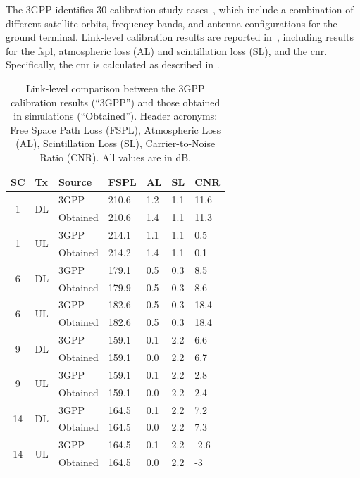The 3GPP identifies 30 calibration study cases~\cite[Tab.~ 6.1.1.1-9]{38821}, which include a combination of different satellite orbits, frequency bands, and antenna configurations for the ground terminal. Link-level calibration results are reported in~\cite[Tab.~6.1.1.2]{38821}, including results for the \gls{fspl}, atmospheric loss (AL) and scintillation loss (SL), and the \gls{cnr}. 
Specifically, the \gls{cnr} is calculated as described in \cite[Section~6.1.3.1]{38821}. 

\begin{table}[t!]
\caption{Link-level comparison between the 3GPP calibration results (``3GPP'') and those obtained in simulations (``Obtained''). Header acronyms:  Free Space Path Loss (FSPL), Atmospheric Loss (AL), Scintillation Loss (SL), Carrier-to-Noise Ratio (CNR). All values are in dB.}
\label{tab:ll-comp}
\vspace{0.1cm}
\centering
\footnotesize
\begin{tabular}{|c|l|l|l|l|l|l|}
\hline
\textbf{SC} & \textbf{Tx} & \textbf{Source} & \textbf{FSPL} & \textbf{AL} & \textbf{SL} & \textbf{CNR} \\ \hline
\multirow{2}{*}{1} & \multirow{2}{*}{DL} & 3GPP & 210.6 & 1.2 & 1.1 & 11.6 \\
 &  & Obtained & 210.6 & 1.4 & 1.1 & 11.3 \\ \hline
\multirow{2}{*}{1} & \multirow{2}{*}{UL} & 3GPP & 214.1 & 1.1 & 1.1 & 0.5 \\
 &  & Obtained & 214.2 & 1.4 & 1.1 & 0.1 \\ \hline
\multirow{2}{*}{6} & \multirow{2}{*}{DL} & 3GPP & 179.1 & 0.5 & 0.3 & 8.5 \\
 &  & Obtained & 179.9 & 0.5 & 0.3 & 8.6 \\ \hline
\multirow{2}{*}{6} & \multirow{2}{*}{UL} & 3GPP & 182.6 & 0.5 & 0.3 & 18.4 \\
 &  & Obtained & 182.6 & 0.5 & 0.3 & 18.4 \\ \hline
\multirow{2}{*}{9} & \multirow{2}{*}{DL} & 3GPP & 159.1 & 0.1 & 2.2 & 6.6 \\
 &  & Obtained & 159.1 & 0.0 & 2.2 & 6.7 \\ \hline
\multirow{2}{*}{9} & \multirow{2}{*}{UL} & 3GPP & 159.1 & 0.1 & 2.2 & 2.8 \\
 &  & Obtained & 159.1 & 0.0 & 2.2 & 2.4 \\ \hline
\multirow{2}{*}{14} & \multirow{2}{*}{DL} & 3GPP & 164.5 & 0.1 & 2.2 & 7.2 \\
 &  & Obtained & 164.5 & 0.0 & 2.2 & 7.3 \\ \hline
\multirow{2}{*}{14} & \multirow{2}{*}{UL} & 3GPP & 164.5 & 0.1 & 2.2 & -2.6 \\
 &  & Obtained & 164.5 & 0.0 & 2.2 & -3 \\ \hline
\end{tabular}
\end{table}

